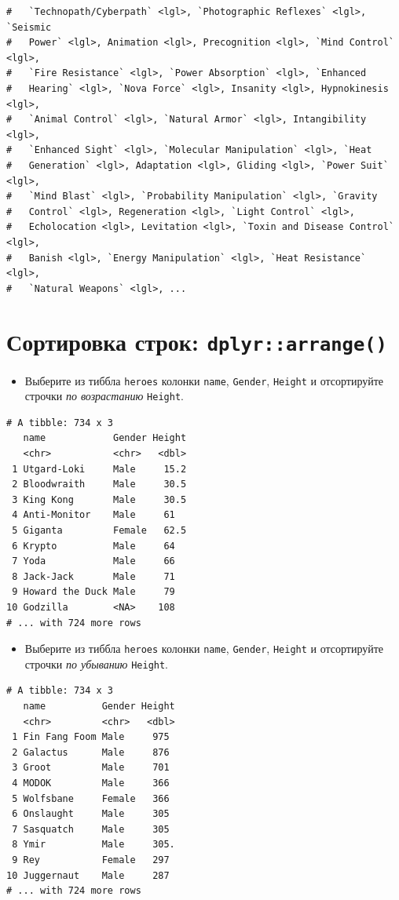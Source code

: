 \documentclass[
]{book}
\providecommand{\tightlist}{%
  \setlength{\itemsep}{0pt}\setlength{\parskip}{0pt}}
\begin{document}
\begin{verbatim}
#   `Technopath/Cyberpath` <lgl>, `Photographic Reflexes` <lgl>, `Seismic
#   Power` <lgl>, Animation <lgl>, Precognition <lgl>, `Mind Control` <lgl>,
#   `Fire Resistance` <lgl>, `Power Absorption` <lgl>, `Enhanced
#   Hearing` <lgl>, `Nova Force` <lgl>, Insanity <lgl>, Hypnokinesis <lgl>,
#   `Animal Control` <lgl>, `Natural Armor` <lgl>, Intangibility <lgl>,
#   `Enhanced Sight` <lgl>, `Molecular Manipulation` <lgl>, `Heat
#   Generation` <lgl>, Adaptation <lgl>, Gliding <lgl>, `Power Suit` <lgl>,
#   `Mind Blast` <lgl>, `Probability Manipulation` <lgl>, `Gravity
#   Control` <lgl>, Regeneration <lgl>, `Light Control` <lgl>,
#   Echolocation <lgl>, Levitation <lgl>, `Toxin and Disease Control` <lgl>,
#   Banish <lgl>, `Energy Manipulation` <lgl>, `Heat Resistance` <lgl>,
#   `Natural Weapons` <lgl>, ...
\end{verbatim}

\hypertarget{task_arr}{%
\section{\texorpdfstring{Сортировка строк: \texttt{dplyr::arrange()}}{Сортировка строк: dplyr::arrange()}}\label{task_arr}}

\begin{itemize}
\tightlist
\item
  Выберите из тиббла \texttt{heroes} колонки \texttt{name}, \texttt{Gender}, \texttt{Height} и отсортируйте строчки \emph{по возрастанию} \texttt{Height}.
\end{itemize}

\begin{verbatim}
# A tibble: 734 x 3
   name            Gender Height
   <chr>           <chr>   <dbl>
 1 Utgard-Loki     Male     15.2
 2 Bloodwraith     Male     30.5
 3 King Kong       Male     30.5
 4 Anti-Monitor    Male     61  
 5 Giganta         Female   62.5
 6 Krypto          Male     64  
 7 Yoda            Male     66  
 8 Jack-Jack       Male     71  
 9 Howard the Duck Male     79  
10 Godzilla        <NA>    108  
# ... with 724 more rows
\end{verbatim}

\begin{itemize}
\tightlist
\item
  Выберите из тиббла \texttt{heroes} колонки \texttt{name}, \texttt{Gender}, \texttt{Height} и отсортируйте строчки \emph{по убыванию} \texttt{Height}.
\end{itemize}

\begin{verbatim}
# A tibble: 734 x 3
   name          Gender Height
   <chr>         <chr>   <dbl>
 1 Fin Fang Foom Male     975 
 2 Galactus      Male     876 
 3 Groot         Male     701 
 4 MODOK         Male     366 
 5 Wolfsbane     Female   366 
 6 Onslaught     Male     305 
 7 Sasquatch     Male     305 
 8 Ymir          Male     305.
 9 Rey           Female   297 
10 Juggernaut    Male     287 
# ... with 724 more rows
\end{verbatim}
\end{document}
